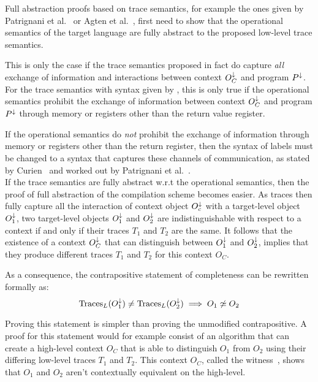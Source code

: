 Full abstraction proofs based on trace semantics, for example the ones given by Patrignani et al.~\cite{Patrignani,Patrignani:TraceSemantics} or Agten et al.~\cite{Agten:2012:SCM:2354412.2355247}, first need to show that the operational semantics of the target language are fully abstract to the proposed low-level trace semantics.

This is only the case if the trace semantics proposed in fact do capture \emph{all} exchange of information and interactions between context $O_C^{\downarrow}$ and program $P^{\downarrow}$.
For the trace semantics with syntax given by , this is only true if the operational semantics prohibit the exchange of information between context $O_C^{\downarrow}$ and program $P^{\downarrow}$ through memory or registers other than the return value register.

If the operational semantics do \emph{not} prohibit the exchange of information through memory or registers other than the return register, then the syntax of labels must be changed to a syntax that captures these channels of communication, as stated by Curien~\cite{Curien2007301} and worked out by Patrignani et al.~\cite{Patrignani:TraceSemantics}.
\\[1em]
If the trace semantics are fully abstract w.r.t the operational semantics, then the proof of full abstraction of the compilation scheme becomes easier.
As traces then fully capture all the interaction of context object $O_{c}^{\downarrow}$ with a target-level object $O_{1}^{\downarrow}$, two target-level objects $O_1^{\downarrow}$ and $O_2^{\downarrow}$ are indistinguishable with respect to a context if and only if their traces $T_1$ and $T_2$ are the same.
It follows that the existence of a context $O_C^{\downarrow}$ that can distinguish between $O_1^{\downarrow}$ and $O_2^{\downarrow}$, implies that they produce different traces $T_1$ and $T_2$ for this context $O_C$.

As a consequence, the contrapositive statement of completeness can be rewritten formally as:
\[
     \text{Traces}_L(O_1^{\downarrow}) \neq  \text{Traces}_L(O_2^{\downarrow}) \implies O_{1} \not\simeq O_{2}
\]

Proving this statement is simpler than proving the unmodified contrapositive.
A proof for this statement would for example consist of an algorithm that can create a high-level context $O_C$ that is able to distinguish $O_1$ from $O_2$ using their differing low-level traces $T_1$ and $T_2$.
This context $O_C$, called the witness~\cite{Patrignani}, shows that $O_1$ and $O_2$ aren't contextually equivalent on the high-level.


